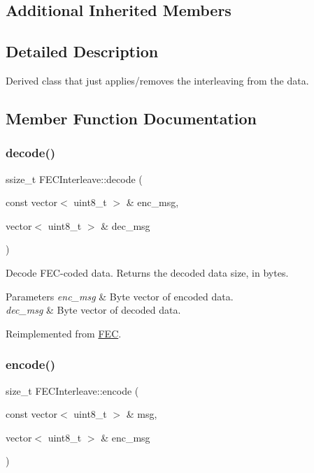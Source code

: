 \subsection*{Additional Inherited Members}


\subsection{Detailed Description}
Derived class that just applies/removes the interleaving from the data. 

\subsection{Member Function Documentation}
\mbox{\label{classFECInterleave_a7e45a890ff7061e0a5c3234d29ac8954}} 
\subsubsection{\texorpdfstring{decode()}{decode()}}
{\footnotesize\ttfamily ssize\+\_\+t F\+E\+C\+Interleave\+::decode (\begin{DoxyParamCaption}\item[{const vector$<$ uint8\+\_\+t $>$ \&}]{enc\+\_\+msg,  }\item[{vector$<$ uint8\+\_\+t $>$ \&}]{dec\+\_\+msg }\end{DoxyParamCaption})\hspace{0.3cm}{\ttfamily [virtual]}}

Decode F\+E\+C-\/coded data. Returns the decoded data size, in bytes. 
\begin{DoxyParams}{Parameters}
{\em enc\+\_\+msg} & Byte vector of encoded data. \\
\hline
{\em dec\+\_\+msg} & Byte vector of decoded data. \\
\hline
\end{DoxyParams}


Reimplemented from \hyperlink{classFEC_aec87f2d9c2305283d226197bf76891cf}{F\+EC}.

\mbox{\label{classFECInterleave_a10d868d7b117193667d0406edec2ef59}} 
\subsubsection{\texorpdfstring{encode()}{encode()}}
{\footnotesize\ttfamily size\+\_\+t F\+E\+C\+Interleave\+::encode (\begin{DoxyParamCaption}\item[{const vector$<$ uint8\+\_\+t $>$ \&}]{msg,  }\item[{vector$<$ uint8\+\_\+t $>$ \&}]{enc\+\_\+msg }\end{DoxyParamCaption})\hspace{0.3cm}{\ttfamily [virtual]}}

